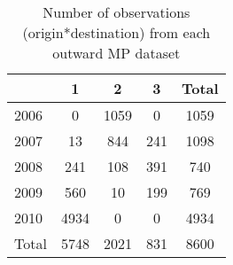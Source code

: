 \begin{table}[htbp]\centering
\caption{Number of observations (origin*destination) from each outward MP dataset}
\begin{tabular}{l*{4}{c}}
\toprule
            &           1&           2&           3&       Total\\
\midrule
2006        &           0&        1059&           0&        1059\\
2007        &          13&         844&         241&        1098\\
2008        &         241&         108&         391&         740\\
2009        &         560&          10&         199&         769\\
2010        &        4934&           0&           0&        4934\\
Total       &        5748&        2021&         831&        8600\\
\bottomrule
\end{tabular}
\end{table}
